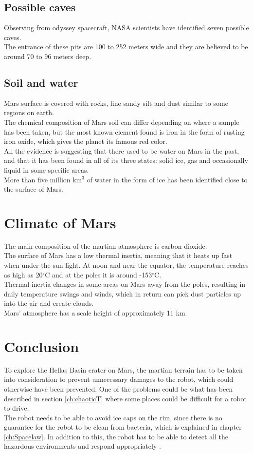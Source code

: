 \subsection{Possible caves}\label{ch:caves}
Observing from odyssey spacecraft, NASA scientists have identified seven possible caves.\\
The entrance of these pits are 100 to 252 meters wide and they are believed to be around 70 to 96 meters deep\cite{surface}\cite{guide}.

\subsection{Soil and water}\label{soil}
Mars surface is covered with rocks, fine sandy silt and dust similar to some regions on earth.\\
The chemical composition of Mars soil can differ depending on where a sample has been taken, but the most known element found is iron in the form of rusting iron oxide, which gives the planet its famous red color.\\
All the evidence is suggesting that there used to be water on Mars in the past, and that it has been found in all of its three states: solid ice, gas and occasionally liquid in some specific areas\cite{liquid}.\\
More than five million km${^3}$ of water in the form of ice has been identified close to the surface of Mars\cite{water}.

\section{Climate of Mars}
The main composition of the martian atmosphere is carbon dioxide.\\
The surface of Mars has a low thermal inertia, meaning that it heats up fast when under the sun light. At noon and near the equator, the temperature reaches as high as 20$^{\circ}$C and at the poles it is around -153$^{\circ}$C.\\
Thermal inertia changes in some areas on Mars away from the poles, resulting in daily temperature swings and winds, which in return can pick dust particles up into the air and create clouds.\\
Mars' atmosphere has a scale height of approximately 11 km\cite{climate}.

\section{Conclusion}
To explore the Hellas Basin crater on Mars, the martian terrain has to be taken into consideration to prevent unnecessary damages to the robot, which could otherwise have been prevented.
One of the problems could be what has been described in section \ref{ch:chaoticT} where some places could be difficult for a robot to drive.\\
The robot needs to be able to avoid ice caps on the rim, since there is no guarantee for the robot to be clean from bacteria, which is explained in chapter \ref{ch:Spacelaw}. In addition to this, the robot has to be able to detect all the hazardous environments and respond appropriately \cite{AspectsWeather}.